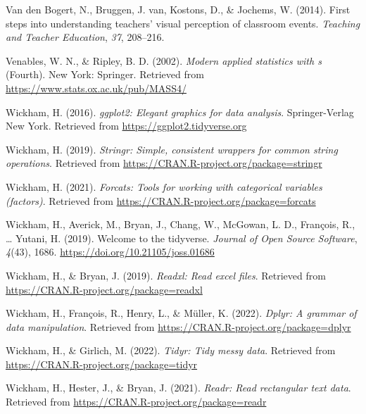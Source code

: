 \documentclass[
  man,floatsintext]{apa6}
\newlength{\cslhangindent}
\newlength{\cslentryspacingunit} %
\newenvironment{CSLReferences}[2] %
 {%
  \setlength{\parindent}{0pt}
  \ifodd #1
  \let\oldpar\par
  \def\par{\hangindent=\cslhangindent\oldpar}
  \fi
  \setlength{\parskip}{#2\cslentryspacingunit}
 }%
 {}
\begin{document}
\begin{CSLReferences}{1}{0}
\leavevmode{}%
Van den Bogert, N., Bruggen, J. van, Kostons, D., \& Jochems, W. (2014). First steps into understanding teachers' visual perception of classroom events. \emph{Teaching and Teacher Education}, \emph{37}, 208--216.

\leavevmode{}%
Venables, W. N., \& Ripley, B. D. (2002). \emph{Modern applied statistics with s} (Fourth). New York: Springer. Retrieved from \url{https://www.stats.ox.ac.uk/pub/MASS4/}

\leavevmode{}%
Wickham, H. (2016). \emph{ggplot2: Elegant graphics for data analysis}. Springer-Verlag New York. Retrieved from \url{https://ggplot2.tidyverse.org}

\leavevmode{}%
Wickham, H. (2019). \emph{Stringr: Simple, consistent wrappers for common string operations}. Retrieved from \url{https://CRAN.R-project.org/package=stringr}

\leavevmode{}%
Wickham, H. (2021). \emph{Forcats: Tools for working with categorical variables (factors)}. Retrieved from \url{https://CRAN.R-project.org/package=forcats}

\leavevmode{}%
Wickham, H., Averick, M., Bryan, J., Chang, W., McGowan, L. D., François, R., \ldots{} Yutani, H. (2019). Welcome to the {tidyverse}. \emph{Journal of Open Source Software}, \emph{4}(43), 1686. \url{https://doi.org/10.21105/joss.01686}

\leavevmode{}%
Wickham, H., \& Bryan, J. (2019). \emph{Readxl: Read excel files}. Retrieved from \url{https://CRAN.R-project.org/package=readxl}

\leavevmode{}%
Wickham, H., François, R., Henry, L., \& Müller, K. (2022). \emph{Dplyr: A grammar of data manipulation}. Retrieved from \url{https://CRAN.R-project.org/package=dplyr}

\leavevmode{}%
Wickham, H., \& Girlich, M. (2022). \emph{Tidyr: Tidy messy data}. Retrieved from \url{https://CRAN.R-project.org/package=tidyr}

\leavevmode{}%
Wickham, H., Hester, J., \& Bryan, J. (2021). \emph{Readr: Read rectangular text data}. Retrieved from \url{https://CRAN.R-project.org/package=readr}


\end{CSLReferences}
\end{document}
